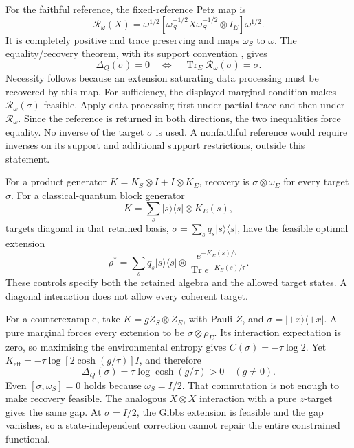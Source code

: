 For the faithful reference, the fixed-reference Petz map is
\begin{equation}
 \mathcal R_\omega(X)=\omega^{1/2}
 [\omega_S^{-1/2}X\omega_S^{-1/2}\otimes I_E]\omega^{1/2}.
 \label{eq:petz-map}
\end{equation}
It is completely positive and trace preserving and maps \(\omega_S\) to \(\omega\). The equality/recovery theorem, with its support convention \cite{Junge20189e4744}, gives
\begin{equation}
 \Delta_Q(\sigma)=0
 \quad\Longleftrightarrow\quad
 \operatorname{Tr}_E\mathcal R_\omega(\sigma)=\sigma .
 \label{eq:recovery-feasibility}
\end{equation}
Necessity follows because an extension saturating data processing must be recovered by this map. For sufficiency, the displayed marginal condition makes \(\mathcal R_\omega(\sigma)\) feasible. Apply data processing first under partial trace and then under \(\mathcal R_\omega\). Since the reference is returned in both directions, the two inequalities force equality. No inverse of the target \(\sigma\) is used. A nonfaithful reference would require inverses on its support and additional support restrictions, outside this statement.

For a product generator
\(K=K_S\otimes I+I\otimes K_E\),
recovery is \(\sigma\otimes\omega_E\) for every target \(\sigma\). For a classical-quantum block generator
\[
 K=\sum_s|s\rangle\langle s|\otimes K_E(s),
\]
targets diagonal in that retained basis,
\(\sigma=\sum_sq_s|s\rangle\langle s|\), have the feasible optimal extension
\[
 \rho^*=\sum_sq_s|s\rangle\langle s|\otimes
 \frac{e^{-K_E(s)/\tau}}{\operatorname{Tr}e^{-K_E(s)/\tau}} .
\]
These controls specify both the retained algebra and the allowed target states. A diagonal interaction does not allow every coherent target.

For a counterexample, take \(K=gZ_S\otimes Z_E\), with Pauli \(Z\), and \(\sigma=|+x\rangle\langle+x|\). A pure marginal forces every extension to be \(\sigma\otimes\rho_E\). Its interaction expectation is zero, so maximising the environmental entropy gives \(C(\sigma)=-\tau\log2\). Yet
\(K_{\mathrm{eff}}=-\tau\log[2\cosh(g/\tau)]I\), and therefore
\begin{equation}
 \Delta_Q(\sigma)=\tau\log\cosh(g/\tau)>0
                         \quad(g\ne0).
 \label{eq:quantum-witness}
\end{equation}
Even \([\sigma,\omega_S]=0\) holds because \(\omega_S=I/2\). That commutation is not enough to make recovery feasible. The analogous \(X\otimes X\) interaction with a pure \(z\)-target gives the same gap. At \(\sigma=I/2\), the Gibbs extension is feasible and the gap vanishes, so a state-independent correction cannot repair the entire constrained functional.

